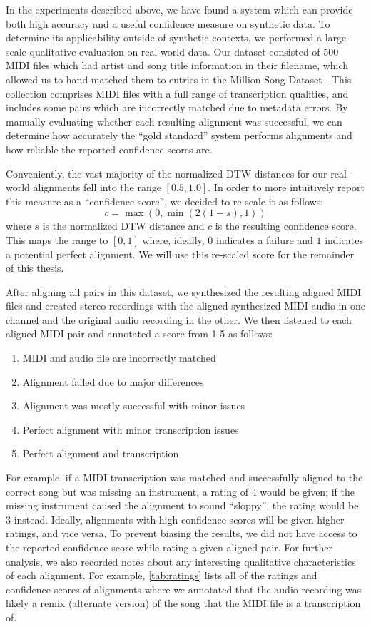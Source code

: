 In the experiments described above, we have found a system which can provide both high accuracy and a useful confidence measure on synthetic data.
To determine its applicability outside of synthetic contexts, we performed a large-scale qualitative evaluation on real-world data.
Our dataset consisted of 500 MIDI files which had artist and song title information in their filename, which allowed us to hand-matched them to entries in the Million Song Dataset \cite{bertin2011million}.
This collection comprises MIDI files with a full range of transcription qualities, and includes some pairs which are incorrectly matched due to metadata errors.
By manually evaluating whether each resulting alignment was successful, we can determine how accurately the ``gold standard'' system performs alignments and how reliable the reported confidence scores are.

Conveniently, the vast majority of the normalized DTW distances for our real-world alignments fell into the range $[0.5, 1.0]$.
In order to more intuitively report this measure as a ``confidence score'', we decided to re-scale it as follows:
\begin{equation}
        c = \max(0, \min(2(1 - s), 1))
        \label{eq:score_normalization}
\end{equation}
where $s$ is the normalized DTW distance and $c$ is the resulting confidence score.
This maps the range to $[0, 1]$ where, ideally, $0$ indicates a failure and $1$ indicates a potential perfect alignment.
We will use this re-scaled score for the remainder of this thesis.

After aligning all pairs in this dataset, we synthesized the resulting aligned MIDI files and created stereo recordings with the aligned synthesized MIDI audio in one channel and the original audio recording in the other.
We then listened to each aligned MIDI pair and annotated a score from 1-5 as follows:
\begin{enumerate}
\item MIDI and audio file are incorrectly matched
\item Alignment failed due to major differences
\item Alignment was mostly successful with minor issues
\item Perfect alignment with minor transcription issues
\item Perfect alignment and transcription
\end{enumerate}
For example, if a MIDI transcription was matched and successfully aligned to the correct song but was missing an instrument, a rating of 4 would be given; if the missing instrument caused the alignment to sound ``sloppy'', the rating would be 3 instead.
Ideally, alignments with high confidence scores will be given higher ratings, and vice versa.
To prevent biasing the results, we did not have access to the reported confidence score while rating a given aligned pair.
For further analysis, we also recorded notes about any interesting qualitative characteristics of each alignment.
For example, \cref{tab:ratings} lists all of the ratings and confidence scores of alignments where we annotated that the audio recording was likely a remix (alternate version) of the song that the MIDI file is a transcription of.

